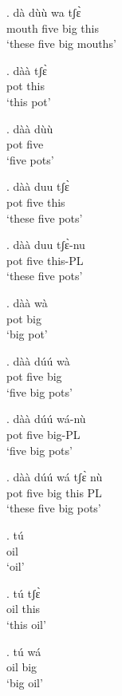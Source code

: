 \documentclass{assets/fieldnotes}
\begin{document}

\exg.
dà      dùù    wa    tʃɛ̀  \\
mouth   five   big   this \\%
`these five big mouths' \label{proximal det}


\exg.
dàà   tʃɛ̀  \\
pot   this \\%
`this pot'

\exg.
dàà   dùù  \\
pot   five \\%
`five pots'

\exg.
dàà   duu    tʃɛ̀  \\
pot   five   this \\%
`these five pots'

\exg.
dàà   duu    tʃɛ̀-nu  \\
pot   five   this-PL \\%
`these five pots'

\exg.
dàà   wà  \\
pot   big \\%
`big pot'

\exg.
dàà   dúú    wà  \\
pot   five   big \\%
`five big pots'

\exg.
dàà   dúú    wá-nù  \\
pot   five   big-PL \\%
`five big pots'

\exg.
dàà   dúú    wá    tʃɛ̀    nù \\
pot   five   big   this   PL \\%
`these five big pots'

\exg.
tú  \\
oil \\%
`oil'

\exg.
tú    tʃɛ̀  \\
oil   this \\%
`this oil'

\exg.
tú    wá  \\
oil   big \\%
`big oil'
\end{document}
